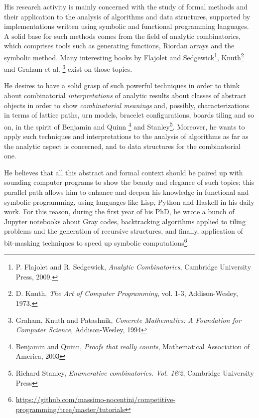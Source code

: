 \documentclass[10pt,a4paper]{scrartcl}
\begin{document}
    His research activity is mainly concerned with the study of formal methods
    and their application to the analysis of algorithms and data structures,
    supported by implementations written using symbolic and functional
    programming languages.  A solid base for such methods comes from the field
    of analytic combinatorics, which comprises tools such as generating
    functions, Riordan arrays and the symbolic method. Many interesting books
    by Flajolet and Sedgewick\footnote{P. Flajolet and R.  Sedgewick,
    \emph{Analytic Combinatorics}, Cambridge University Press, 2009.},
    Knuth\footnote{D. Knuth, \emph{The Art of Computer Programming}, vol.  1-3,
    Addison-Wesley, 1973.} and Graham et al. \footnote{Graham, Knuth and
    Patashnik, \emph{Concrete Mathematics: A Foundation for Computer Science},
    Addison-Wesley, 1994} exist on those topics. 


    He desires to have a solid grasp of such powerful techniques in order to
    think about combinatorial \emph{interpretations} of
    analytic results about classes of abstract objects in order to show
    \emph{combinatorial meanings} and, possibly, characterizations in terms
    of lattice paths, urn models, bracelet configurations, boards
    tiling and so on, in the spirit of Benjamin and Quinn \footnote{Benjamin
    and Quinn, \emph{Proofs that really counts}, Mathematical Association of
    America, 2003} and Stanley\footnote{Richard Stanley, \emph{Enumerative
    combinatorics. {V}ol. 1\&2}, Cambridge University Press}. Moreover, he wants
    to apply such techniques and interpretations to the analysis of algorithms
    as far as the analytic aspect is concerned, and to data structures for the
    combinatorial one. 

    He believes that all this abstract and formal context should be paired up with
    sounding computer programs to show the beauty and elegance of such topics;
    this parallel path allows him to enhance and deepen his knowledge in functional
    and symbolic programming, using languages like Lisp, Python and Haskell in his daily work.
    For this reason, during the first year of his PhD, he wrote a bunch of Jupyter 
    notebooks about Gray codes, backtracking algorithms applied to tiling problems
    and the generation of recursive structures, and finally, application
    of bit-masking techniques to speed up symbolic computations\footnote{\url{https://github.com/massimo-nocentini/competitive-programming/tree/master/tutorials}}.
\end{document}
